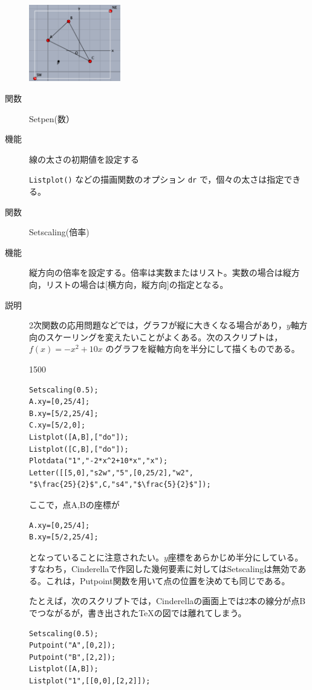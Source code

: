 \documentclass[papersize,a4paper,12pt,uplatex]{jsarticle}
\begin{document}
\begin{description}
\hspace{10mm} \includegraphics[bb=0 0 299.02 250.01, width=4cm]{Fig/setorigin.pdf} 
\hspace{5mm} 

\vspace{\baselineskip}
\hypertarget{setpen}{}
\item[関数]Setpen(数）
\item[機能]線の太さの初期値を設定する

\verb|Listplot()| などの描画関数のオプション \verb|dr| で，個々の太さは指定できる。

\vspace{\baselineskip}
\hypertarget{setscaling}{}
\item[関数]Setscaling(倍率)
\item[機能]縦方向の倍率を設定する。倍率は実数またはリスト。実数の場合は縦方向，リストの場合は[横方向，縦方向]の指定となる。
\item[説明]2次関数の応用問題などでは，グラフが縦に大きくなる場合があり，$y$軸方向のスケーリングを変えたいことがよくある。次のスクリプトは，$f(x)=-x^2+10x$ のグラフを縦軸方向を半分にして描くものである。

\begin{layer}{150}{0}
\end{layer}
\begin{verbatim}
Setscaling(0.5);
A.xy=[0,25/4];
B.xy=[5/2,25/4];
C.xy=[5/2,0];
Listplot([A,B],["do"]);
Listplot([C,B],["do"]);
Plotdata("1","-2*x^2+10*x","x");
Letter([[5,0],"s2w","5",[0,25/2],"w2",
"$\frac{25}{2}$",C,"s4","$\frac{5}{2}$"]);
\end{verbatim}
ここで，点A,Bの座標が
\begin{verbatim}
A.xy=[0,25/4];
B.xy=[5/2,25/4];
\end{verbatim}
となっていることに注意されたい。$y$座標をあらかじめ半分にしている。すなわち，Cinderellaで作図した幾何要素に対してはSetscalingは無効である。これは，Putpoint関数を用いて点の位置を決めても同じである。

たとえば，次のスクリプトでは，Cinderellaの画面上では2本の線分が点Bでつながるが，書き出された\TeX の図では離れてしまう。
\begin{verbatim}
Setscaling(0.5);
Putpoint("A",[0,2]);
Putpoint("B",[2,2]);
Listplot([A,B]);
Listplot("1",[[0,0],[2,2]]);
\end{verbatim}


\end{description}
\end{document}
